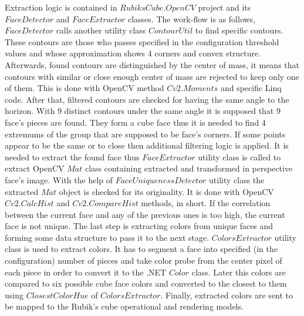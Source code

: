 \documentclass[../../main.tex]{subfiles}
\begin{document}
Extraction logic is contained in $RubiksCube.OpenCV$ project and its $FaceDetector$ and $FaceExtractor$ classes. The work-flow is as follows, $FaceDetector$ calls another utility class $ContourUtil$ to find specific contours. These contours are those who passes specified in the configuration threshold values and whose approximation shows 4 corners and convex structure. Afterwards, found contours are distinguished by the center of mass, it means that contours with similar or close enough center of mass are rejected to keep only one of them. This is done with \ac{OpenCV} method $Cv2.Moments$ and specific {\Csharp} \ac{Linq} code. After that, filtered contours are checked for having the same angle to the horizon. With 9 distinct contours under the same angle it is supposed that 9 face's pieces are found. They form a cube face thus it is needed to find 4 extremums of the group that are supposed to be face's corners. If some points appear to be the same or to close then additional filtering logic is applied. It is needed to extract the found face thus $FaceExtractor$ utility class is called to extract \ac{OpenCV} $Mat$ class containing extracted and transformed in perspective face's image. With the help of $FaceUniquenessDetector$ utility class the extracted $Mat$ object is checked for its originality. It is done with \ac{OpenCV} $Cv2.CalcHist$ and $Cv2.CompareHist$ methods, in short. If the correlation between the current face and any of the previous ones is too high, the current face is not unique. The last step is extracting colors from unique faces and forming some data structure to pass it to the next stage. $ColorsExtractor$ utility class is used to extract colors. It has to segment a face into specified (in the configuration) number of pieces and take color probe from the center pixel of each piece in order to convert it to the .NET $Color$ class. Later this colors are compared to six possible cube face colors and converted to the closest to them using $ClosestColorHue$ of $ColorsExtractor$. Finally, extracted colors are sent to be mapped to the Rubik's cube operational and rendering models.
\end{document}
